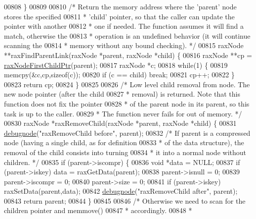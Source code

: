 \begin{DoxyCode}
{{{{{{{{{{{{00808 \}
00809 
00810 \textcolor{comment}{/* Return the memory address where the 'parent' node stores the specified}
00811 \textcolor{comment}{ * 'child' pointer, so that the caller can update the pointer with another}
00812 \textcolor{comment}{ * one if needed. The function assumes it will find a match, otherwise the}
00813 \textcolor{comment}{ * operation is an undefined behavior (it will continue scanning the}
00814 \textcolor{comment}{ * memory without any bound checking). */}
00815 raxNode **raxFindParentLink(raxNode *parent, raxNode *child) \{
00816     raxNode **cp = \hyperlink{rax_8c_aa94163a0d02b30219ef18e5a3ea06ca6}{raxNodeFirstChildPtr}(parent);
00817     raxNode *c;
00818     \textcolor{keywordflow}{while}(1) \{
00819         memcpy(&c,cp,\textcolor{keyword}{sizeof}(c));
00820         \textcolor{keywordflow}{if} (c == child) \textcolor{keywordflow}{break};
00821         cp++;
00822     \}
00823     \textcolor{keywordflow}{return} cp;
00824 \}
00825 
00826 \textcolor{comment}{/* Low level child removal from node. The new node pointer (after the child}
00827 \textcolor{comment}{ * removal) is returned. Note that this function does not fix the pointer}
00828 \textcolor{comment}{ * of the parent node in its parent, so this task is up to the caller.}
00829 \textcolor{comment}{ * The function never fails for out of memory. */}
00830 raxNode *raxRemoveChild(raxNode *parent, raxNode *child) \{
00831     \hyperlink{rax_8c_a622b73fbdc398cdbfa8cc1fb87283cb4}{debugnode}(\textcolor{stringliteral}{"raxRemoveChild before"}, parent);
00832     \textcolor{comment}{/* If parent is a compressed node (having a single child, as for definition}
00833 \textcolor{comment}{     * of the data structure), the removal of the child consists into turning}
00834 \textcolor{comment}{     * it into a normal node without children. */}
00835     \textcolor{keywordflow}{if} (parent->iscompr) \{
00836         \textcolor{keywordtype}{void} *data = NULL;
00837         \textcolor{keywordflow}{if} (parent->iskey) data = raxGetData(parent);
00838         parent->isnull = 0;
00839         parent->iscompr = 0;
00840         parent->size = 0;
00841         \textcolor{keywordflow}{if} (parent->iskey) raxSetData(parent,data);
00842         \hyperlink{rax_8c_a622b73fbdc398cdbfa8cc1fb87283cb4}{debugnode}(\textcolor{stringliteral}{"raxRemoveChild after"}, parent);
00843         \textcolor{keywordflow}{return} parent;
00844     \}
00845 
00846     \textcolor{comment}{/* Otherwise we need to scan for the children pointer and memmove()}
00847 \textcolor{comment}{     * accordingly.}
00848 \textcolor{comment}{     *}
}}}}}}}}}}}}
\end{DoxyCode}
